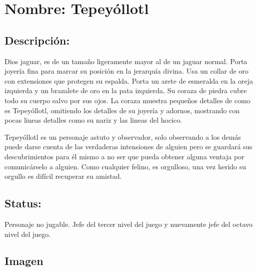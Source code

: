 \section{Nombre: Tepeyóllotl}  \label{per:tepeyollotl}
\subsection{Descripción:}    
Dios jaguar, es de un tamaño ligeramente mayor al de un jaguar normal. Porta joyería fina para marcar su posición en la jerarquía divina. Usa un collar de oro con extensiones que protegen su espalda. Porta un arete de esmeralda en la oreja izquierda y un brazalete de oro en la pata izquierda. Su coraza de piedra cubre todo su cuerpo salvo por sus ojos. La coraza muestra pequeños detalles de como es Tepeyóllotl, omitiendo los detalles de su joyería y adornos, mostrando con pocas lineas detalles como su nariz y las lineas del hocico.
\\
\par
Tepeyóllotl es un personaje astuto y observador, solo observando a los demás puede darse cuenta de las verdaderas intensiones de alguien pero se guardará sus descubrimientos para él mismo a no ser que pueda obtener alguna ventaja por comunicárselo a alguien. Como cualquier felino, es orgulloso, una vez herido su orgullo es difícil recuperar su amistad. \subsection{Status:}
Personaje no jugable.
Jefe del tercer nivel del juego y nuevamente jefe del octavo nivel del juego.
\subsection{Imagen}
